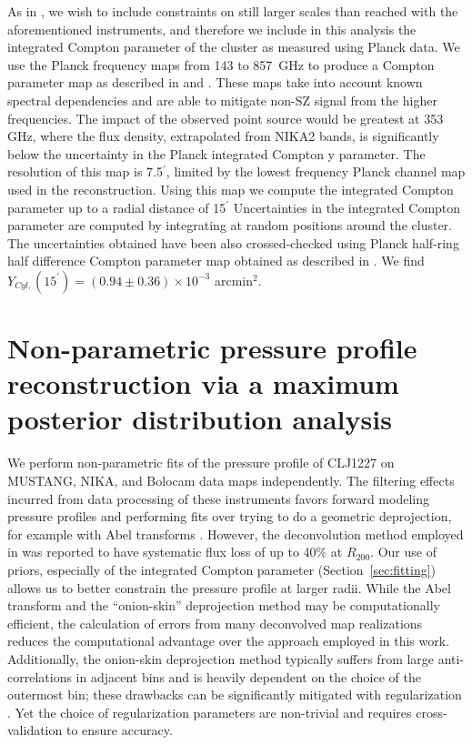 \documentclass[onecolumn,traditabstract]{aa}
\begin{document}
As in \citet{adam2015}, we wish to include constraints on still larger scales than reached with the aforementioned instruments,
and therefore we include in this analysis the integrated Compton parameter of the cluster as measured using Planck data.
We use the Planck frequency maps from 143 to 857~GHz to produce a Compton parameter map as described in \citet{hurier2013} and
\citet{planck2013ymap,planck2016_tsz}. These maps take into account known spectral dependencies and are able to mitigate non-SZ
  signal from the higher frequencies. The impact of the observed point source would be greatest at 353 GHz, where the flux density,
  extrapolated from NIKA2 bands, is significantly below the uncertainty in the Planck integrated Compton y parameter.
The resolution of this map is 7.5$^{\prime}$, limited by the lowest frequency Planck channel
map used in the reconstruction. Using this map we compute the integrated Compton parameter up to a radial distance of 15$^{\prime}$
Uncertainties in the integrated Compton parameter are computed by integrating at random positions
around the cluster. The uncertainties obtained have been also crossed-checked using Planck half-ring half difference Compton parameter
map
obtained as described in \citet{planck2013ymap,planck2016_tsz}. We find $Y_{Cyl,}(15^{\prime}) = (0.94 \pm 0.36) \times 10^{-3}$ arcmin$^2$. 


\section{Non-parametric pressure profile reconstruction via a maximum posterior distribution analysis}
\label{sec:ml_deproj}

We perform non-parametric fits of the pressure profile of CLJ1227 on MUSTANG, NIKA, and Bolocam data maps independently.
The filtering effects incurred from data processing of these instruments favors forward modeling pressure profiles and
performing fits over trying to do a geometric deprojection, for example with Abel transforms \citep[e.g.,][]{basu2010}.
However, the deconvolution method employed in \citet{basu2010} was reported to have systematic flux loss of up to 40\%
at $R_{200}$. Our use of priors, especially of the integrated Compton parameter (Section~\ref{sec:fitting}) allows us to
better constrain the pressure profile at larger radii. While the Abel transform and the ``onion-skin'' deprojection method
\citep[e.g.,][]{kriss1983} may be computationally efficient, the calculation of errors from many deconvolved map realizations
\citep[e.g., 100 as in ][]{david2001,basu2010} reduces the computational advantage over the approach employed in this work.
Additionally, the onion-skin deprojection method typically suffers from large anti-correlations in adjacent bins and is heavily
dependent on the choice of the outermost bin; these drawbacks can be significantly mitigated with regularization \citep[e.g.,][]{croston2006}.
Yet the choice of regularization parameters are non-trivial and requires cross-validation to ensure accuracy.
\end{document}
